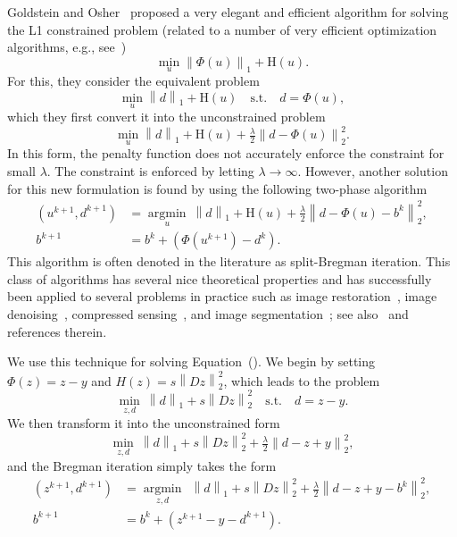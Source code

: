 \documentclass[preprint]{imsart}
\newcommand{\argmin}[1]{\underset{#1}{\operatorname{argmin}}\ }
\newcommand{\funct}[1]{\mathrm{#1}}
\newcommand{\norm}[2]{\left\| #1 \right\|_{#2}}
\begin{document}
Goldstein and Osher~\cite{goldstein09} proposed a very elegant and efficient algorithm for solving the L1 constrained problem
(related to a number of very efficient optimization algorithms, e.g., see~\cite{combettes11})
\begin{equation}
    \min_u \norm{\Phi(u)}{1} + \funct{H}(u) .
\end{equation}
For this, they consider the equivalent problem
\begin{equation}
    \min_u \norm{d}{1} + \funct{H}(u) \quad \text{s.t.} \quad d = \Phi(u) ,
\end{equation}
which they first convert it into the unconstrained problem
\begin{equation}
    \min_u \norm{d}{1} + \funct{H}(u) + \tfrac{\lambda}{2} \norm{d - \Phi(u)}{2}^2 .
\end{equation}
In this form, the penalty function does not accurately enforce the constraint for small $\lambda$. The constraint is enforced by letting $\lambda \rightarrow \infty$.
However, another solution for this new formulation is found by using the following two-phase algorithm
\begin{align}
    \left( u^{k+1}, d^{k+1} \right) &= \argmin{u} \norm{d}{1} + \funct{H}(u) +
    \tfrac{\lambda}{2} \norm{d - \Phi(u) - b^k}{2}^2 ,\\
    b^{k+1} &= b^k + \left( \Phi(u^{k+1}) - d^k \right) .
\end{align}
This algorithm is often denoted in the literature as split-Bregman iteration. This class of algorithms has several nice theoretical properties and has successfully been applied to several problems in practice such as image restoration~\cite{osher05}, image denoising~\cite{xu07}, compressed sensing~\cite{yin08}, and image segmentation~\cite{goldstein10}; see also~\cite{combettes11} and references therein.

We use this technique for solving Equation~(). We begin by setting $\Phi(z) = z-y$ and $H(z) = s \norm{Dz}{2}^2$, which leads to the problem
\begin{equation}
    \min_{z, d} \ \norm{d}{1} + s \norm{Dz}{2}^ 2  \quad \text{s.t.} \quad d = z - y .
\end{equation}
We then transform it into the unconstrained form
\begin{equation}
    \min_{z, d} \ \norm{d}{1} + s \norm{Dz}{2}^ 2 + \tfrac{\lambda}{2} \norm{d - z + y}{2}^2 ,
    \label{eq:L1formulationExtended}
\end{equation}
and the Bregman iteration simply takes the form
\begin{align}
    \left( z^{k+1}, d^{k+1} \right) & = \argmin{z, d} \ \norm{d}{1} + s \norm{Dz}{2}^ 2 +
    \tfrac{\lambda}{2} \norm{d - z + y - b^k}{2}^2 ,
    \label{eq:splitBregman1}\\
    b^{k+1} & = b^k + (z^{k+1} - y - d^{k+1}) . \label{eq:splitBregman2}
\end{align}
\end{document}
